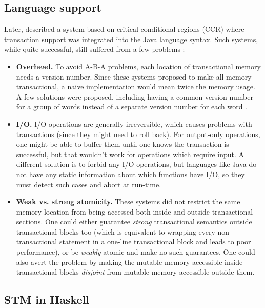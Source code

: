 \documentclass[a4paper]{acmtrans2m}
\begin{document}
\subsection{Language support}

Later,  described a system based on critical conditional
regions (CCR) \cite{Hoare:1972} where transaction support was integrated into
the Java language syntax. Such systems, while quite successful, still suffered
from a few problems \cite{Harris:2005,Duffy:2010}:

\begin{itemize}
\item \textbf{Overhead.} To avoid A-B-A problems, each location of transactional
  memory needs a version number. Since these systems proposed to make all memory
  transactional, a naive implementation would mean twice the memory usage. A few
  solutions were proposed, including having a common version number for a group
  of words instead of a separate version number for each word
  \cite{Harris:2003}.
\item \textbf{I/O.} I/O operations are generally irreversible, which causes
  problems with transactions (since they might need to roll back). For
  output-only operations, one might be able to buffer them until one knows the
  transaction is successful, but that wouldn't work for operations which require
  input. A different solution is to forbid any I/O operations, but languages
  like Java do not have any static information about which functions have I/O,
  so they must detect such cases and abort at run-time.
\item \textbf{Weak vs. strong atomicity.} These systems did not restrict the
  same memory location from being accessed both inside and outside transactional
  sections. One could either guarantee \textit{strong} transactional semantics
  outside transactional blocks too (which is equivalent to wrapping every
  non-transactional statement in a one-line transactional block and leads to
  poor performance), or be \textit{weakly} atomic and make no such
  guarantees. One could also avert the problem by making the mutable memory
  accessible inside transactional blocks \textit{disjoint} from mutable memory
  accessible outside them.
\end{itemize}

\subsection{STM in Haskell}
\end{document}
